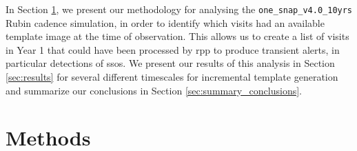 \documentclass[preprintm,linenumbers]{aastex631}
\newcommand{\baselinefull}{\texttt{one\_snap\_v4.0\_10yrs}\xspace}
\begin{document}
 In Section \ref{sec:methods}, we present our methodology for analysing the \baselinefull Rubin cadence simulation, %
 in order to identify which visits had an available template image at the time of observation.
 This allows us to create a list of visits in Year 1 that could have been processed by \gls*{rpp} to produce transient alerts, in particular detections of \glspl*{sso}.
 We present our results of this analysis in Section \ref{sec:results} for several different timescales for incremental template generation and summarize our conclusions in Section \ref{sec:summary_conclusions}.  
	
	\section{Methods}
	\label{sec:methods}
\end{document}
